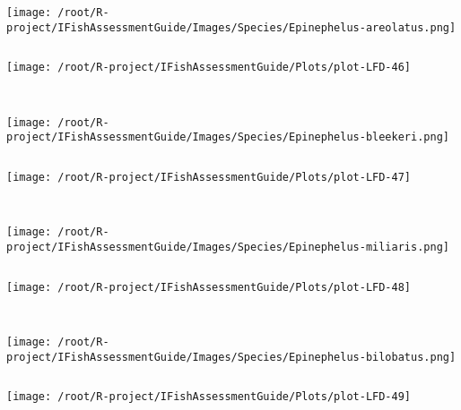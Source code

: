 \documentclass{report}\usepackage[]{graphicx}\usepackage[]{color}
\makeatletter
\def\maxwidth{ %
  \ifdim\Gin@nat@width>\linewidth
    \linewidth
  \else
    \Gin@nat@width
  \fi
}
\newenvironment{kframe}{%
 \def\at@end@of@kframe{}%
 \ifinner\ifhmode%
  \def\at@end@of@kframe{\end{minipage}}%
  \begin{minipage}{\columnwidth}%
 \fi\fi%
 \def\FrameCommand##1{\hskip\@totalleftmargin \hskip-\fboxsep
 \colorbox{shadecolor}{##1}\hskip-\fboxsep
     \hskip-\linewidth \hskip-\@totalleftmargin \hskip\columnwidth}%
 \MakeFramed {\advance\hsize-\width
   \@totalleftmargin\z@ \linewidth\hsize
   \@setminipage}}%
 {\par\unskip\endMakeFramed%
 \at@end@of@kframe}
\newenvironment{knitrout}{}{} %
\makeatother
\begin{document}
\begin{knitrout}
\begin{kframe}
\begin{verbatim}
\end{verbatim}
\end{kframe}
\texttt{[image: /root/R-project/IFishAssessmentGuide/Images/Species/Epinephelus-areolatus.png]}
\begin{kframe}\begin{verbatim}
\end{verbatim}
\end{kframe}
\texttt{[image: /root/R-project/IFishAssessmentGuide/Plots/plot-LFD-46]} 
\begin{kframe}\begin{verbatim}
 
\end{verbatim}
\end{kframe}
\texttt{[image: /root/R-project/IFishAssessmentGuide/Images/Species/Epinephelus-bleekeri.png]}
\begin{kframe}\begin{verbatim}
\end{verbatim}
\end{kframe}
\texttt{[image: /root/R-project/IFishAssessmentGuide/Plots/plot-LFD-47]} 
\begin{kframe}\begin{verbatim}
 
\end{verbatim}
\end{kframe}
\texttt{[image: /root/R-project/IFishAssessmentGuide/Images/Species/Epinephelus-miliaris.png]}
\begin{kframe}\begin{verbatim}
\end{verbatim}
\end{kframe}
\texttt{[image: /root/R-project/IFishAssessmentGuide/Plots/plot-LFD-48]} 
\begin{kframe}\begin{verbatim}
 
\end{verbatim}
\end{kframe}
\texttt{[image: /root/R-project/IFishAssessmentGuide/Images/Species/Epinephelus-bilobatus.png]}
\begin{kframe}\begin{verbatim}
\end{verbatim}
\end{kframe}
\texttt{[image: /root/R-project/IFishAssessmentGuide/Plots/plot-LFD-49]} 
\begin{kframe}\begin{verbatim}
 

\end{verbatim}
\end{kframe}
\end{knitrout}
\end{document}
